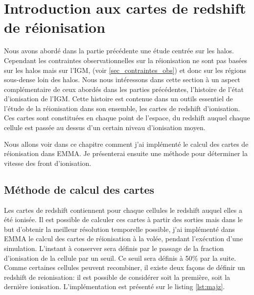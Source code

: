 \chapter{Introduction aux cartes de redshift de réionisation}

Nous avons abordé dans la partie précédente une étude centrée sur les halos.
Cependant les contraintes observationnelles sur la réionisation ne sont pas basées sur les halos mais sur l'\ac{IGM}, (voir \ref{sec_contraintes_obs}) et donc sur les régions sous-dense loin des halos.
Nous nous intéressons dans cette section à un aspect complémentaire de ceux abordés dans les parties précédentes, l'histoire de l'état d'ionisation de l'\ac{IGM}.
Cette histoire est contenue dans un outils essentiel de l'étude de la réionisation dans son ensemble, les cartes de redshift d'ionisation.
Ces cartes sont constituées en chaque point de l'espace, du redshift auquel chaque cellule est passée au dessus d'un certain niveau d'ionisation moyen.

Nous allons voir dans ce chapitre comment j'ai implémenté le calcul des cartes de réionisation dans EMMA.
Je présenterai ensuite une méthode pour déterminer la vitesse des front d’ionisation.


\section{Méthode de calcul des cartes}
\label{sec:zmapcompute}

Les cartes de redshift contiennent pour chaque cellules le redshift auquel elles a été ionisée.
Il est possible de calculer ces cartes à partir des sorties mais dans le but d'obtenir la meilleur résolution temporelle possible, j'ai implémenté dans EMMA le calcul des cartes de réionisation à la volée, pendant l'exécution d'une simulation.
L'instant à conserver sera définis par le passage de la fraction d'ionisation de la cellule par un seuil.
Ce seuil sera définis à  50\% par la suite.
Comme certaines cellules peuvent recombiner, il existe deux façons de définir un redshift de reionisation: il est possible de considérer soit la première, soit la dernière ionisation.
L'implémentation est présenté sur le listing \ref{lst:majz}.

